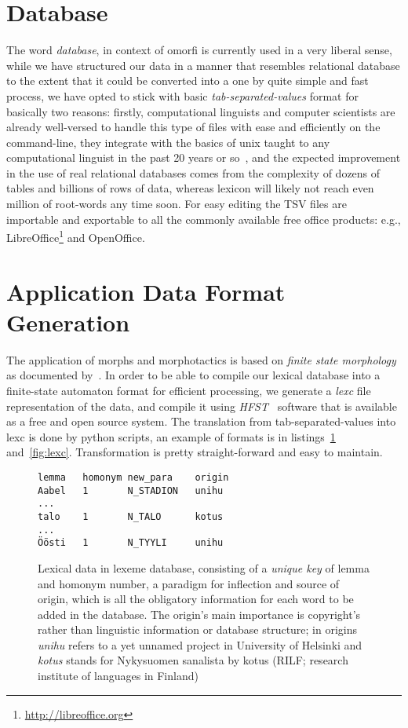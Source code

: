 \documentclass[11pt]{article}
\begin{document}
\section{Database}

The word \emph{database}, in context of omorfi is currently used in a very
liberal sense, while we have structured our data in a manner that resembles
relational database to the extent that it could be converted into a one by
quite simple and fast process, we have opted to stick with basic
\emph{tab-separated-values} format for basically two reasons: firstly,
computational linguists and computer scientists are already well-versed to
handle this type of files with ease and efficiently on the command-line, they
integrate with the basics of unix taught to any computational linguist in the
past 20 years or so~\cite{church1994unix}, and the expected improvement in the use of real
relational databases comes from the complexity of dozens of tables and billions
of rows of data, whereas lexicon will likely not reach even million of
root-words any time soon. For easy editing the TSV files are importable and
exportable to all the commonly available free office products: e.g.,
LibreOffice\footnote{\url{http://libreoffice.org}} and OpenOffice.

\section{Application Data Format Generation}

The application of morphs and morphotactics is based
on \emph{finite state morphology} as documented 
by~. In order to be able
to compile our lexical database into a finite-state
automaton format for efficient processing, we
generate a \emph{lexc} file representation of the
data, and compile it using \emph{HFST}~\cite{hfst}
software that is available as a free and open source
system. The translation from tab-separated-values
into lexc is done by python scripts, an example of
formats is in listings~\ref{fig:tsv}
and~\ref{fig:lexc}.  Transformation is pretty
straight-forward and easy to maintain.

\begin{figure}[ht]
    \centering
    \begin{verbatim}
lemma   homonym new_para    origin
Aabel   1       N_STADION   unihu
...
talo    1       N_TALO      kotus
...
Öösti   1       N_TYYLI     unihu
    \end{verbatim}
    \caption{Lexical data in lexeme database,
        consisting of a \emph{unique key} of lemma
        and homonym number, a paradigm for inflection
        and source of origin, which is all the
        obligatory information for each word to be
        added in the database. The origin's main importance is
        copyright's rather than linguistic information or database
        structure; in origins
        \emph{unihu} refers to a yet unnamed project
        in University of Helsinki and \emph{kotus}
    stands for Nykysuomen sanalista by kotus (RILF;
research institute of languages in Finland)
\label{fig:tsv}}
\end{figure}
\end{document}
